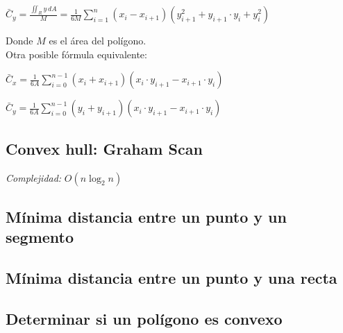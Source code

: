 \documentclass[10pt,letterpaper]{article}
\begin{document}
\medskip

$\displaystyle\bar{C}_{y} = \frac{ \displaystyle\iint_{R} y \, dA }{M} = \frac{1}{6M} \sum_{i=1}^{n} (x_{i} - x_{i+1}) (y_{i+1}^2 + y_{i+1} \cdot y_{i} + y_{i}^2)$

\medskip

Donde $ M $ es el área del polígono. \\

Otra posible fórmula equivalente:

$ \displaystyle\bar{C}_{x} = \frac{1}{6A} \sum_{i=0}^{n-1} (x_{i} + x_{i+1}) (x_{i} \cdot y_{i+1} - x_{i+1} \cdot y_{i}) $

\medskip

$ \displaystyle\bar{C}_{y} = \frac{1}{6A} \sum_{i=0}^{n-1} (y_{i} + y_{i+1}) (x_{i} \cdot y_{i+1} - x_{i+1} \cdot y_{i}) $


\subsection{Convex hull: Graham Scan}
\emph{Complejidad:} $ O(n \log_{2}{n}) $

\subsection{Mínima distancia entre un punto y un segmento}

\subsection{Mínima distancia entre un punto y una recta}

\subsection{Determinar si un polígono es convexo}
\end{document}
